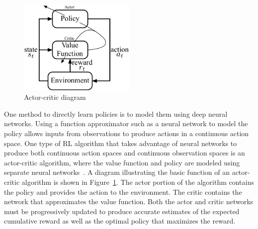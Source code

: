 %
\begin{figure}[tb]
\begin{center}
\includegraphics[width = 0.5\textwidth]{figures/figures_introduction/Actor_Critic_diagram.pdf}
\caption{Actor-critic diagram}
\label{fig_chap1:AC_diagram}
\end{center}
\end{figure}
%

%
One method to directly learn policies is to model them using deep neural networks.
Using a function approximator such as a neural network to model the policy allows inputs from observations to produce actions in a continuous action space.
%
One type of RL algorithm that takes advantage of neural networks to produce both continuous action spaces and continuous observation spaces is an actor-critic algorithm, where the value function and policy are modeled using separate neural networks~\cite{Lillicrap:2016a,Fujimoto:2018a}.
A diagram illustrating the basic function of an actor-critic algorithm is shown in Figure~\ref{fig_chap1:AC_diagram}. The actor portion of the algorithm contains the policy and provides the action to the environment. The critic contains the network that approximates the value function. Both the actor and critic networks must be progressively updated to produce accurate estimates of the expected cumulative reward as well as the optimal policy that maximizes the reward.

